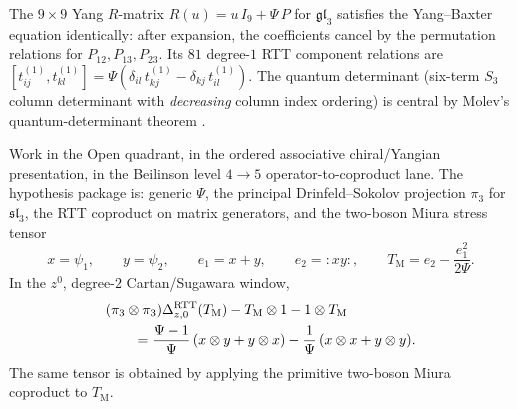 \begin{remark}[$N = 3$ explicit calculation]
\label{rem:gl3-explicit}
The $9 \times 9$ Yang $R$-matrix $R(u) = u\,I_9 + \Psi\,P$
for $\mathfrak{gl}_3$ satisfies the Yang--Baxter equation identically:
after expansion, the coefficients cancel by the permutation relations
for $P_{12},P_{13},P_{23}$.  Its $81$ degree-$1$ RTT component
relations are
$[t_{ij}^{(1)}, t_{kl}^{(1)}] = \Psi(\delta_{il}\,
t_{kj}^{(1)} - \delta_{kj}\,t_{il}^{(1)})$.
The quantum determinant (six-term $S_3$ column
determinant with \emph{decreasing} column index ordering)
is central by Molev's quantum-determinant theorem
\cite[Theorem~1.6.4]{Molev07}.
\end{remark}

\begin{computation}
\label{comp:ds-w3-degree2-rtt-miura-witness}
Work in the Open quadrant, in the ordered associative
chiral/Yangian presentation, in the Beilinson level
$4 \to 5$ operator-to-coproduct lane.  The hypothesis package is:
generic $\Psi$, the principal Drinfeld--Sokolov projection
$\pi_3$ for $\mathfrak{sl}_3$, the RTT coproduct on matrix
generators, and the two-boson Miura stress tensor
\[
 x=\psi_1,\qquad y=\psi_2,\qquad
 e_1=x+y,\qquad e_2={:}xy{:},\qquad
 T_{\mathrm{M}}=e_2-\frac{e_1^2}{2\Psi}.
\]
In the $z^0$, degree-$2$ Cartan/Sugawara window,
\begin{align}
\label{eq:ds-w3-degree2-rtt-miura-window}
 &(\pi_3\otimes\pi_3)\Delta^{\mathrm{RTT}}_{z,0}(T_{\mathrm{M}})
 -T_{\mathrm{M}}\otimes1-1\otimes T_{\mathrm{M}} \\
 &\qquad =
 \frac{\Psi-1}{\Psi}\,(x\otimes y+y\otimes x)
 -\frac{1}{\Psi}\,(x\otimes x+y\otimes y).
 \notag
\end{align}
The same tensor is obtained by applying the primitive two-boson
Miura coproduct to \(T_{\mathrm{M}}\).
\end{computation}

